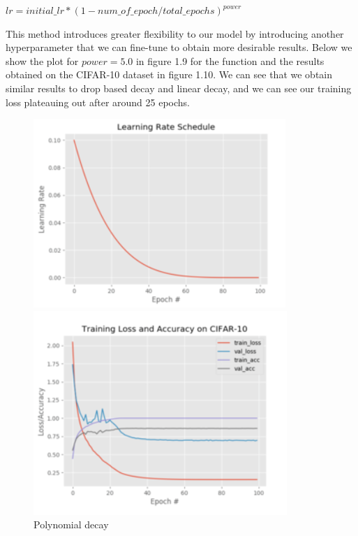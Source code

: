 \begin{center}
    \begin{math}
    lr = initial\_lr*(1-num\_of\_epoch/total\_epochs)^{power}
    \end{math}
\end{center}

This method introduces greater flexibility to our model by introducing another hyperparameter that we can fine-tune to obtain more desirable results. Below we show the plot for \(power=5.0\) in figure 1.9 for the function and the results obtained on the CIFAR-10 dataset in figure 1.10. We can see that we obtain similar results to drop based decay and linear decay, and we can see our training loss plateauing out after around 25 epochs.

\begin{figure}[!ht]
  \centering
  \begin{minipage}[b]{0.4\textwidth}
    \includegraphics[width=\textwidth]{./imgs/2019A7PS0097P-09.png}
    \caption{Polynomial decay}
    \label{fig:polynomial_decay}
  \end{minipage}
  \hfill
  \begin{minipage}[b]{0.4\textwidth}
    \includegraphics[width=\textwidth]{./imgs/2019A7PS0097P-10.png}

\end{minipage}
\end{figure}
